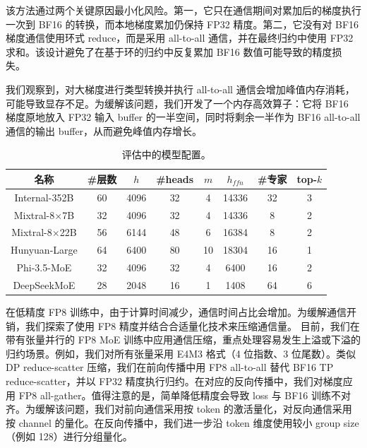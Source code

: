 该方法通过两个关键原因最小化风险。第一，它只在通信期间对累加后的梯度执行一次到 BF16 的转换，而本地梯度累加仍保持 FP32 精度。第二，它没有对 BF16 梯度通信使用环式 reduce，而是采用 all-to-all 通信，并在最终归约中使用 FP32 求和。该设计避免了在基于环的归约中反复累加 BF16 数值可能导致的精度损失。

我们观察到，对大梯度进行类型转换并执行 all-to-all 通信会增加峰值内存消耗，可能导致显存不足。为缓解该问题，我们开发了一个内存高效算子：它将 BF16 梯度原地放入 FP32 输入 buffer 的一半空间，同时将剩余一半作为 BF16 all-to-all 通信的输出 buffer，从而避免峰值内存增长。

\begin{table}[t!]
    \centering
    \resizebox{\linewidth}{!} {
        \begin{tabular}{@{}cccccccc@{}}
            \toprule
            名称 & \#层数 & $h$ & \#heads & $m$ & $h_{ffn}$ & \#专家 & top-$k$ \\\midrule
            Internal-352B & 60 & 4096 & 32 & 4 & 14336 & 32 & 3 \\
            Mixtral-8$\times$7B & 32 & 4096 & 32 & 4 & 14336 & 8 & 2 \\
            Mixtral-8$\times$22B & 56 & 6144 & 48 & 6 & 16384 & 8 & 2 \\
            Hunyuan-Large & 64 & 6400 & 80 & 10 & 18304 & 16 & 1 \\
            Phi-3.5-MoE & 32 & 4096 & 32 & 4 & 6400 & 16 & 2 \\
            DeepSeekMoE & 28 & 2048 & 16 & 1 & 1408 & 64 & 6 \\
            \bottomrule
        \end{tabular}
    }
    \caption{评估中的模型配置。}
    \vspace{-0.2in}
    \label{tab:evaluation:model_conf}
\end{table}

 在低精度 FP8 训练中，由于计算时间减少，通信时间占比会增加。为缓解通信开销，我们探索了使用 FP8 精度并结合合适量化技术来压缩通信量。
目前，我们在带有张量并行的 FP8 MoE 训练中应用通信压缩，重点处理容易发生上溢或下溢的归约场景。例如，我们对所有张量采用 E4M3 格式（4 位指数、3 位尾数）。类似 DP reduce-scatter 压缩，我们在前向传播中用 FP8 all-to-all 替代 BF16 TP reduce-scatter，并以 FP32 精度执行归约。在对应的反向传播中，我们对梯度应用 FP8 all-gather。值得注意的是，简单降低精度会导致 loss 与 BF16 训练不对齐。为缓解该问题，我们对前向通信采用按 token 的激活量化，对反向通信采用按 channel 的量化。在反向传播中，我们进一步沿 token 维度使用较小 group size（例如 128）进行分组量化。
